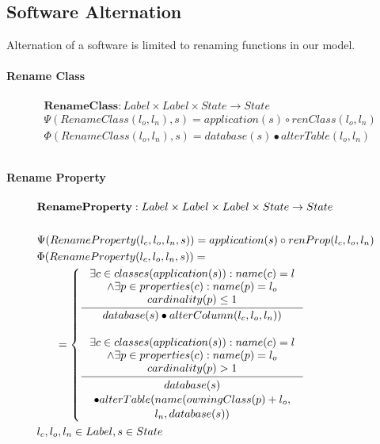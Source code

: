 \documentclass[11pt]{article}
\begin{document}
\subsection{Software Alternation}
Alternation of a software is limited to renaming functions in our model.
\paragraph{Rename Class}
\begin{align*}
& \mathbf{RenameClass} : Label \times Label \times State \rightarrow State \\ 
& \Psi(RenameClass(l_o, l_n), s) = application(s) \circ renClass(l_o, l_n) \\
& \Phi(RenameClass(l_o, l_n), s) = database(s) \bullet alterTable(l_o, l_n) \\ \\
\end{align*}

\paragraph{Rename Property}
\begin{align*}
&	\mathbf{RenameProperty} : Label \times Label \times Label \times State \rightarrow State \\ \\
& \Psi(RenameProperty(l_c, l_o, l_n, s)) = application(s) \circ renProp(l_c, l_o, l_n) \\
& \Phi(RenameProperty(l_c, l_o, l_n, s)) = \\
& \;\;\;\;\;\; =\begin{cases}
 	\inference{\exists c \in classes(application(s)) : name(c) = l\\ 
		\wedge \exists p \in properties(c) : name(p) = l_o \\
 	cardinality(p) \leq 1}{database(s) \bullet alterColumn(l_c, l_o, l_n))} \\\\
 	\inference{\exists c \in classes(application(s)) : name(c) = l\\ 
		\wedge \exists p \in properties(c) : name(p) = l_o \\
 	cardinality(p) > 1}{\begin{gathered}
		database(s)\\ \bullet alterTable(name(owningClass(p)+l_o, \\l_n, database(s))
\end{gathered}}
 \end{cases}\\
& l_c, l_o, l_n \in Label,  s \in State
\end{align*}
\end{document}
